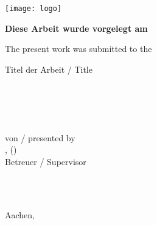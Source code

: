 
\begingroup

\begin{flushright}
\texttt{[image: logo]}
\end{flushright}

\begin{flushleft}
\normalsize{\begin{otherlanguage}{ngerman}\textbf{Diese Arbeit wurde vorgelegt am \instituteDE}
\end{otherlanguage}\newline 
The present work was submitted to the \instituteEN} 
\end{flushleft}
\vspace{2.5cm}

\begin{flushleft}

\begin{otherlanguage}{ngerman}
\normalsize{Titel der Arbeit / Title}\\
\end{otherlanguage}
\normalsize{\titleDE\\\titleEN}\\
\vspace{2.5cm}
\normalsize{\texttypeDE}\\
\normalsize{\texttypeEN}\\
\vspace{2.5cm}
\normalsize{von / presented by}\\
\normalsize{\LastName, \FirstName} \normalsize{(\Matriculation)}\\

\vspace{2.5cm}
\normalsize{Betreuer / Supervisor}\\
\normalsize{\supervisorA}\\
\normalsize{\supervisorB}
\vspace{2.5cm}

\normalsize{\profA}\\
\normalsize{\profB}
\end{flushleft}

\vfill

\begin{otherlanguage}{ngerman}
\begin{flushright}
\normalsize{Aachen, \Date}
\end{flushright}
\end{otherlanguage}

\endgroup

\restoregeometry

\cleardoublepage

